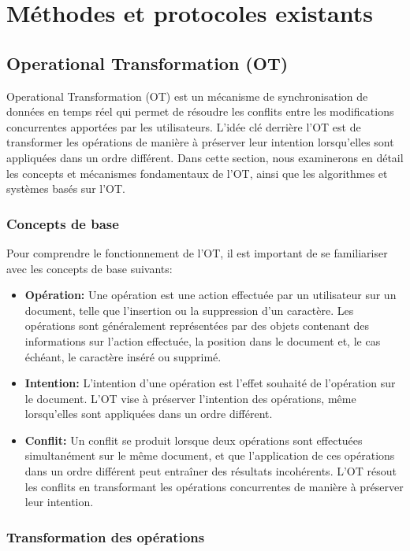 \section{Méthodes et protocoles existants}

\subsection{Operational Transformation (OT)}

Operational Transformation (OT) est un mécanisme de synchronisation de données en temps réel qui permet de résoudre les conflits entre les modifications concurrentes apportées par les utilisateurs. L'idée clé derrière l'OT est de transformer les opérations de manière à préserver leur intention lorsqu'elles sont appliquées dans un ordre différent. Dans cette section, nous examinerons en détail les concepts et mécanismes fondamentaux de l'OT, ainsi que les algorithmes et systèmes basés sur l'OT.

\subsubsection{Concepts de base}

Pour comprendre le fonctionnement de l'OT, il est important de se familiariser avec les concepts de base suivants:

\begin{itemize}
\item \textbf{Opération:} Une opération est une action effectuée par un utilisateur sur un document, telle que l'insertion ou la suppression d'un caractère. Les opérations sont généralement représentées par des objets contenant des informations sur l'action effectuée, la position dans le document et, le cas échéant, le caractère inséré ou supprimé.
\item \textbf{Intention:} L'intention d'une opération est l'effet souhaité de l'opération sur le document. L'OT vise à préserver l'intention des opérations, même lorsqu'elles sont appliquées dans un ordre différent.
\item \textbf{Conflit:} Un conflit se produit lorsque deux opérations sont effectuées simultanément sur le même document, et que l'application de ces opérations dans un ordre différent peut entraîner des résultats incohérents. L'OT résout les conflits en transformant les opérations concurrentes de manière à préserver leur intention.
\end{itemize}

\subsubsection{Transformation des opérations}

